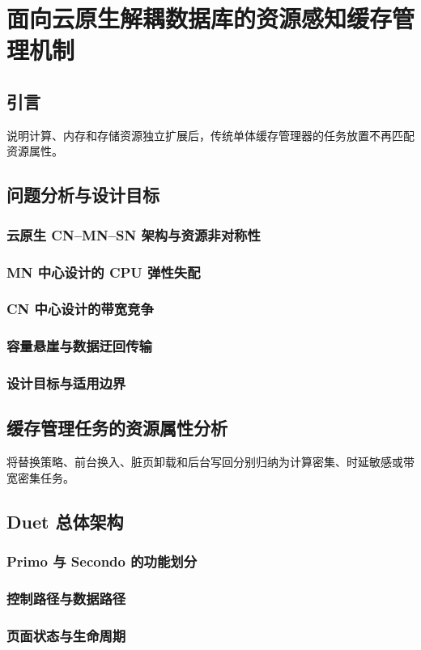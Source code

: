 \chapter{面向云原生解耦数据库的资源感知缓存管理机制}

\section{引言}
说明计算、内存和存储资源独立扩展后，传统单体缓存管理器的任务放置不再匹配资源属性。
\section{问题分析与设计目标}
\subsection{云原生 CN--MN--SN 架构与资源非对称性}
\subsection{MN 中心设计的 CPU 弹性失配}
\subsection{CN 中心设计的带宽竞争}
\subsection{容量悬崖与数据迂回传输}
\subsection{设计目标与适用边界}

\section{缓存管理任务的资源属性分析}
将替换策略、前台换入、脏页卸载和后台写回分别归纳为计算密集、时延敏感或带宽密集任务。
\section{Duet 总体架构}
\subsection{Primo 与 Secondo 的功能划分}
\subsection{控制路径与数据路径}
\subsection{页面状态与生命周期}

